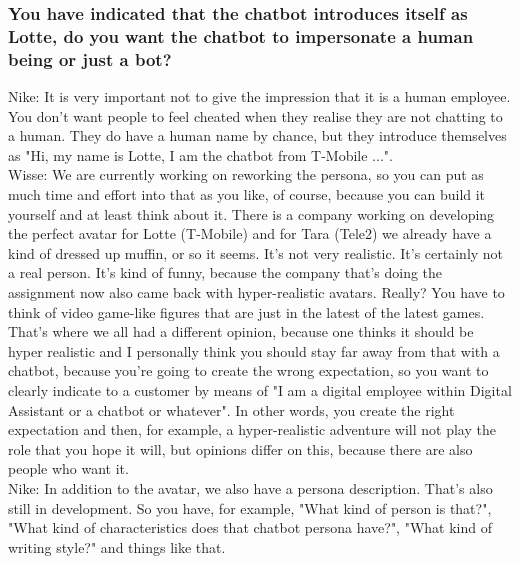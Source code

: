 \begin{appendices}
	\subsubsection{You have indicated that the chatbot introduces itself as Lotte, do you want the chatbot to impersonate a human being or just a bot?}
	Nike: It is very important not to give the impression that it is a human employee. You don't want people to feel cheated when they realise they are not chatting to a human. They do have a human name by chance, but they introduce themselves as "Hi, my name is Lotte, I am the chatbot from T-Mobile ...". \\
	\break
	Wisse: We are currently working on reworking the persona, so you can put as much time and effort into that as you like, of course, because you can build it yourself and at least think about it. There is a company working on developing the perfect avatar for Lotte (T-Mobile) and for Tara (Tele2) we already have a kind of dressed up muffin, or so it seems. It's not very realistic. It's certainly not a real person. It's kind of funny, because the company that's doing the assignment now also came back with hyper-realistic avatars. Really? You have to think of video game-like figures that are just in the latest of the latest games. That's where we all had a different opinion, because one thinks it should be hyper realistic and I personally think you should stay far away from that with a chatbot, because you're going to create the wrong expectation, so you want to clearly indicate to a customer by means of "I am a digital employee within Digital Assistant or a chatbot or whatever". In other words, you create the right expectation and then, for example, a hyper-realistic adventure will not play the role that you hope it will, but opinions differ on this, because there are also people who want it.\\
	\break
	Nike: In addition to the avatar, we also have a persona description. That's also still in development. So you have, for example, "What kind of person is that?", "What kind of characteristics does that chatbot persona have?", "What kind of writing style?" and things like that.
	

\end{appendices}
